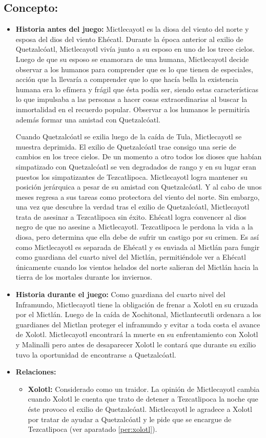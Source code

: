 \subsection{Concepto:}
\begin{itemize}
	\item \textbf{Historia antes del juego:}
	Mictlecayotl es la diosa del viento del norte y esposa del dios del viento Ehécatl. Durante la época anterior al exilio de Quetzalcóatl, Mictlecayotl vivía junto a su esposo en uno de los trece cielos. Luego de que su esposo se enamorara de una humana,  Mictlecayotl decide observar a los humanos para comprender que es lo que tienen de especiales, acción que la llevaría a comprender que lo que hacía bella la existencia humana era lo efímera y frágil que ésta podía ser, siendo estas características lo que impulsaba a las personas a hacer cosas extraordinarias al buscar la inmortalidad en el recuerdo popular. Observar a los humanos le permitiría además formar una amistad con Quetzalcóatl.
	\\
	\par
	Cuando Quetzalcóatl se exilia luego de la caída de Tula,  Mictlecayotl se muestra deprimida. El exilio de Quetzalcóatl trae consigo una serie de cambios en los trece cielos. De un momento a otro todos los dioses que habían simpatizado con Quetzalcóatl se ven degradados de rango y en su lugar eran puestos los simpatizantes de Tezcatlipoca. Mictlecayotl logra mantener su posición jerárquica a pesar de su amistad con Quetzalcóatl. Y al cabo de unos meses regresa a sus tareas como protectora del viento del norte. Sin embargo, una vez que descubre la verdad tras el exilio de Quetzalcóatl,  Mictlecayotl trata de asesinar a Tezcatlipoca sin éxito. Ehécatl logra convencer al dios negro de que no asesine a Mictlecayotl. Tezcatlipoca le perdona la vida a la diosa, pero determina que ella debe de sufrir un castigo por su crimen. Es así como Mictlecayotl es separada de Ehécatl y es enviada al Mictlán para fungir como guardiana del cuarto nivel del Mictlán, permitiéndole ver a Ehécatl únicamente cuando los vientos helados del norte salieran del Mictlán hacia la tierra de los mortales durante los inviernos.			
	\item \textbf{Historia durante el juego:}
	Como guardiana del cuarto nivel del Inframundo, Mictlecayotl tiene la obligación de frenar a Xolotl en su cruzada por el Mictlán. Luego de la caída de Xochitonal, Mictlantecutli ordenara a los guardianes del Mictlan proteger el inframundo y evitar a toda costa el avance de Xolotl. Mictlecayotl encontrará la muerte en su enfrentamiento con Xolotl y Malinalli pero antes de desaparecer Xolotl le contará que durante su exilio tuvo la oportunidad de encontrarse a Quetzalcóatl.
	\item \textbf{Relaciones:}
	\begin{itemize}
		\item \textbf{Xolotl:} Considerado como un traidor. La opinión de Mictlecayotl cambia cuando Xolotl le cuenta que trato de detener a Tezcatlipoca la noche que éste provoco el exilio de Quetzalcóatl. Mictlecayotl le agradece a Xolotl por tratar de ayudar a Quetzalcóatl y le pide que se encargue de Tezcatlipoca (ver aparatado \ref{per:xolotl}).
		

\end{itemize}
\end{itemize}
